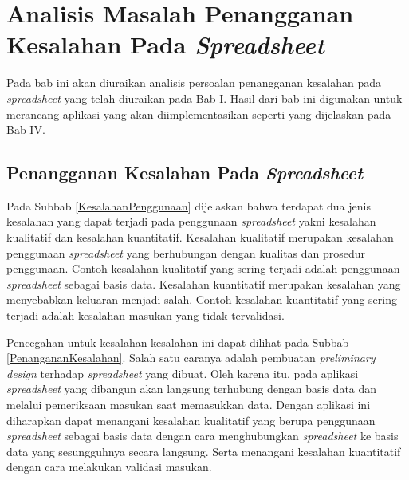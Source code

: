 \chapter{Analisis Masalah Penangganan Kesalahan Pada \textit{Spreadsheet}}

Pada bab ini akan diuraikan analisis persoalan penangganan kesalahan pada \textit{spreadsheet} yang telah diuraikan pada Bab I. Hasil dari bab ini digunakan untuk merancang aplikasi yang akan diimplementasikan seperti yang dijelaskan pada Bab IV.

\section{Penangganan Kesalahan Pada \textit{Spreadsheet}}
Pada Subbab \ref{KesalahanPenggunaan} dijelaskan bahwa terdapat dua jenis kesalahan yang dapat terjadi pada penggunaan \textit{spreadsheet} yakni kesalahan kualitatif dan kesalahan kuantitatif. Kesalahan kualitatif merupakan kesalahan penggunaan \textit{spreadsheet} yang berhubungan dengan kualitas dan prosedur penggunaan. Contoh kesalahan kualitatif yang sering terjadi adalah penggunaan \textit{spreadsheet} sebagai basis data. Kesalahan kuantitatif merupakan kesalahan yang menyebabkan keluaran menjadi salah. Contoh kesalahan kuantitatif yang sering terjadi adalah kesalahan masukan yang tidak tervalidasi.

Pencegahan untuk kesalahan-kesalahan ini dapat dilihat pada Subbab \ref{PenangananKesalahan}. Salah satu caranya adalah pembuatan \textit{preliminary design} terhadap \textit{spreadsheet} yang dibuat. Oleh karena itu, pada aplikasi \textit{spreadsheet} yang dibangun akan langsung terhubung dengan basis data dan melalui pemeriksaan masukan saat memasukkan data. Dengan aplikasi ini diharapkan dapat menangani kesalahan kualitatif yang berupa penggunaan \textit{spreadsheet} sebagai basis data dengan cara menghubungkan \textit{spreadsheet} ke basis data yang sesungguhnya secara langsung. Serta menangani kesalahan kuantitatif dengan cara melakukan validasi masukan.

